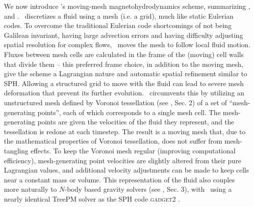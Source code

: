 We now introduce \arepo's moving-mesh magnetohydrodynamics scheme, summarizing \cite{spri10}, \cite{pakmbs11} and \cite{pakms13}.  \arepo\ discretizes a fluid using a mesh (i.e. a grid), much like static Eulerian codes.  To overcome the traditional Eulerian code shortcomings of not being Galilean invariant, having large advection errors and having difficulty adjusting spatial resolution for complex flows, \arepo\ moves the mesh to follow local fluid motion.  Fluxes between mesh cells are calculated in the frame of the (moving) cell walls that divide them -- this preferred frame choice, in addition to the moving mesh, give the scheme a Lagrangian nature and automatic spatial refinement similar to SPH.  Allowing a structured grid to move with the fluid can lead to severe mesh deformation that prevent its further evolution.  \arepo\ circumvents this by utilizing an unstructured mesh defined by Voronoi tessellation (see \citealt{spri10}, Sec. 2) of a set of ``mesh-generating points'', each of which corresponds to a single mesh cell.  The mesh-generating points are given the velocities of the fluid they represent, and the tessellation is redone at each timestep.  The result is a moving mesh that, due to the mathematical properties of Voronoi tessellation, does not suffer from mesh-tangling effects.  To keep the Voronoi mesh regular (improving computational efficiency), mesh-generating point velocities are slightly altered from their pure Lagrangian values, and additional velocity adjustments can be made to keep cells near a constant mass or volume.  This representation of the fluid also couples more naturally to $N$-body based gravity solvers (see \citealt{spri10}, Sec. 3), with \arepo\ using a nearly identical TreePM solver as the SPH code \textsc{gadget2} \citep{spri05}.


